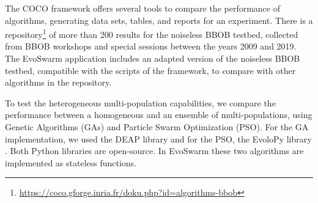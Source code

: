 \documentclass[review]{elsarticle}
\begin{document}
The COCO framework offers several tools to compare the performance of
algorithms, generating data sets, tables, and reports for an experiment. There
is a repository\footnote{\url{https://coco.gforge.inria.fr/doku.php?id=algorithms-bbob}} 
of more than 200 results for the noiseless BBOB testbed, collected from 
BBOB workshops and special sessions between the years 2009 and 2019. The
EvoSwarm application includes an adapted version of the noiseless BBOB testbed,
compatible with the scripts of the framework, to compare with other algorithms
in the repository.

To test the heterogeneous multi-population capabilities,  we compare the
performance between a homogeneous and an ensemble of multi-populations, using
Genetic Algorithms (GAs) and Particle Swarm Optimization (PSO). For the GA
implementation, we used the DEAP library \cite{fortin2012deap} and for the PSO,
the EvoloPy library \cite{faris2016evolopy}. Both Python libraries are
open-source. In EvoSwarm these two algorithms are implemented as stateless
functions.
\end{document}
